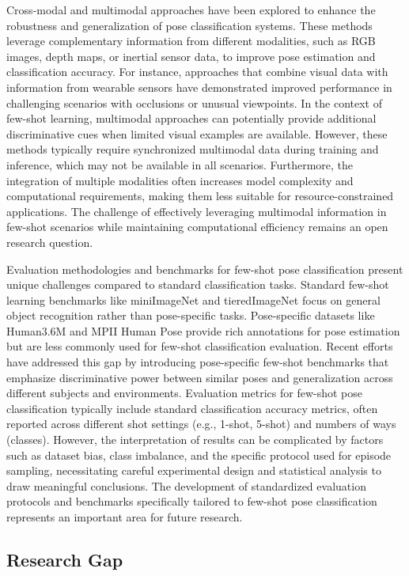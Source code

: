 \documentclass[11pt]{article}
\begin{document}
Cross-modal and multimodal approaches have been explored to enhance the robustness and generalization of pose classification systems. These methods leverage complementary information from different modalities, such as RGB images, depth maps, or inertial sensor data, to improve pose estimation and classification accuracy. For instance, approaches that combine visual data with information from wearable sensors have demonstrated improved performance in challenging scenarios with occlusions or unusual viewpoints. In the context of few-shot learning, multimodal approaches can potentially provide additional discriminative cues when limited visual examples are available. However, these methods typically require synchronized multimodal data during training and inference, which may not be available in all scenarios. Furthermore, the integration of multiple modalities often increases model complexity and computational requirements, making them less suitable for resource-constrained applications. The challenge of effectively leveraging multimodal information in few-shot scenarios while maintaining computational efficiency remains an open research question.

Evaluation methodologies and benchmarks for few-shot pose classification present unique challenges compared to standard classification tasks. Standard few-shot learning benchmarks like miniImageNet and tieredImageNet focus on general object recognition rather than pose-specific tasks. Pose-specific datasets like Human3.6M and MPII Human Pose provide rich annotations for pose estimation but are less commonly used for few-shot classification evaluation. Recent efforts have addressed this gap by introducing pose-specific few-shot benchmarks that emphasize discriminative power between similar poses and generalization across different subjects and environments. Evaluation metrics for few-shot pose classification typically include standard classification accuracy metrics, often reported across different shot settings (e.g., 1-shot, 5-shot) and numbers of ways (classes). However, the interpretation of results can be complicated by factors such as dataset bias, class imbalance, and the specific protocol used for episode sampling, necessitating careful experimental design and statistical analysis to draw meaningful conclusions. The development of standardized evaluation protocols and benchmarks specifically tailored to few-shot pose classification represents an important area for future research.

\subsection{Research Gap}
\end{document}
